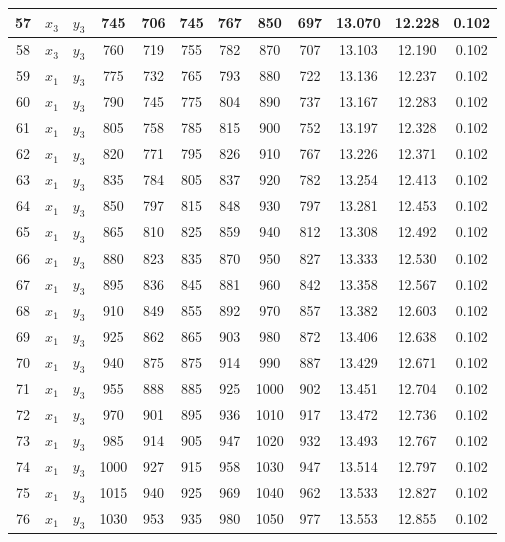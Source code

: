 \begin{longtable}[H]{c|c|c|c|c|c|c|c|c|c|c|c|}
    57 & $x_3$ & $y_3$ & 745 & 706 & 745 & 767 & 850 & 697 & 13.070 & 12.228 & 0.102 \\ \hline
    58 & $x_3$ & $y_3$ & 760 & 719 & 755 & 782 & 870 & 707 & 13.103 & 12.190 & 0.102 \\ \hline
    59 & $x_1$ & $y_3$ & 775 & 732 & 765 & 793 & 880 & 722 & 13.136 & 12.237 & 0.102 \\ \hline
    60 & $x_1$ & $y_3$ & 790 & 745 & 775 & 804 & 890 & 737 & 13.167 & 12.283 & 0.102 \\ \hline
    61 & $x_1$ & $y_3$ & 805 & 758 & 785 & 815 & 900 & 752 & 13.197 & 12.328 & 0.102 \\ \hline
    62 & $x_1$ & $y_3$ & 820 & 771 & 795 & 826 & 910 & 767 & 13.226 & 12.371 & 0.102 \\ \hline
    63 & $x_1$ & $y_3$ & 835 & 784 & 805 & 837 & 920 & 782 & 13.254 & 12.413 & 0.102 \\ \hline
    64 & $x_1$ & $y_3$ & 850 & 797 & 815 & 848 & 930 & 797 & 13.281 & 12.453 & 0.102 \\ \hline
    65 & $x_1$ & $y_3$ & 865 & 810 & 825 & 859 & 940 & 812 & 13.308 & 12.492 & 0.102 \\ \hline
    66 & $x_1$ & $y_3$ & 880 & 823 & 835 & 870 & 950 & 827 & 13.333 & 12.530 & 0.102 \\ \hline
    67 & $x_1$ & $y_3$ & 895 & 836 & 845 & 881 & 960 & 842 & 13.358 & 12.567 & 0.102 \\ \hline
    68 & $x_1$ & $y_3$ & 910 & 849 & 855 & 892 & 970 & 857 & 13.382 & 12.603 & 0.102 \\ \hline
    69 & $x_1$ & $y_3$ & 925 & 862 & 865 & 903 & 980 & 872 & 13.406 & 12.638 & 0.102 \\ \hline
    70 & $x_1$ & $y_3$ & 940 & 875 & 875 & 914 & 990 & 887 & 13.429 & 12.671 & 0.102 \\ \hline
    71 & $x_1$ & $y_3$ & 955 & 888 & 885 & 925 & 1000 & 902 & 13.451 & 12.704 & 0.102 \\ \hline
    72 & $x_1$ & $y_3$ & 970 & 901 & 895 & 936 & 1010 & 917 & 13.472 & 12.736 & 0.102 \\ \hline
    73 & $x_1$ & $y_3$ & 985 & 914 & 905 & 947 & 1020 & 932 & 13.493 & 12.767 & 0.102 \\ \hline
    74 & $x_1$ & $y_3$ & 1000 & 927 & 915 & 958 & 1030 & 947 & 13.514 & 12.797 & 0.102 \\ \hline
    75 & $x_1$ & $y_3$ & 1015 & 940 & 925 & 969 & 1040 & 962 & 13.533 & 12.827 & 0.102 \\ \hline
    76 & $x_1$ & $y_3$ & 1030 & 953 & 935 & 980 & 1050 & 977 & 13.553 & 12.855 & 0.102 \\ \hline

\end{longtable}
